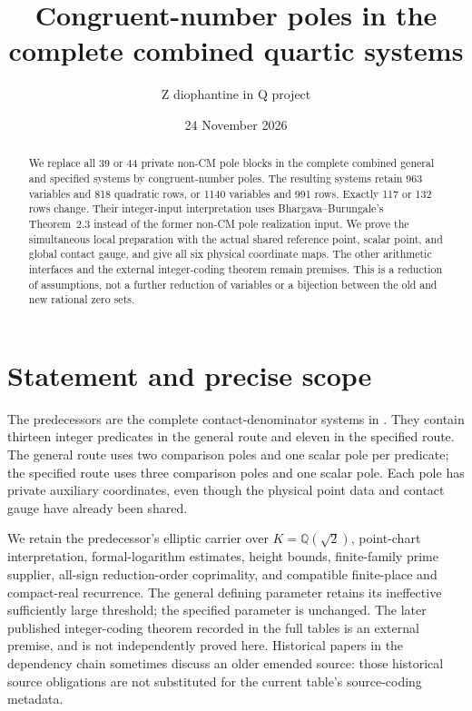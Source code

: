 \documentclass[11pt]{article}
\title{Congruent-number poles in the complete combined quartic systems}
\author{Z diophantine in Q project}
\date{24 November 2026}
\newcommand{\Q}{\mathbb Q}
\begin{document}
\maketitle

\begin{abstract}
We replace all 39 or 44 private non-CM pole blocks in the complete
combined general and specified systems by congruent-number poles.
The resulting systems retain 963 variables and 818 quadratic rows,
or 1140 variables and 991 rows. Exactly 117 or 132 rows change.
Their integer-input interpretation uses Bhargava--Burungale's
Theorem~2.3 instead of the former non-CM pole realization input.
We prove the simultaneous local preparation with the actual shared
reference point, scalar point, and global contact gauge, and give
all six physical coordinate maps. The other arithmetic interfaces
and the external integer-coding theorem remain premises. This is
a reduction of assumptions, not a further reduction of variables
or a bijection between the old and new rational zero sets.
\end{abstract}

\section{Statement and precise scope}

The predecessors are the complete contact-denominator systems in
\cite{v103}. They contain thirteen integer predicates in the general
route and eleven in the specified route. The general route uses two
comparison poles and one scalar pole per predicate; the specified
route uses three comparison poles and one scalar pole. Each pole
has private auxiliary coordinates, even though the physical point
data and contact gauge have already been shared.

We retain the predecessor's elliptic carrier over $K=\Q(\sqrt2)$,
point-chart interpretation, formal-logarithm estimates, height bounds,
finite-family prime supplier, all-sign reduction-order coprimality,
and compatible finite-place and compact-real recurrence. The
general defining parameter retains its ineffective sufficiently
large threshold; the specified parameter is unchanged. The later
published integer-coding theorem recorded in the full tables is an
external premise, and is not independently proved here. Historical
papers in the dependency chain sometimes discuss an older emended
source: those historical source obligations are not substituted for
the current table's source-coding metadata.
\end{document}
